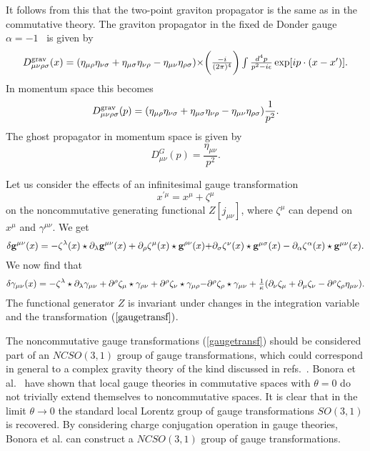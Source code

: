\documentclass[a4paper,10pt]{article}
\begin{document}
It follows from this that the two-point graviton propagator is the same as in the
commutative theory. The graviton propagator in the fixed de
Donder gauge $\alpha=-1$~\cite{Donder} is given by
\begin{equation}
D^{\rm
grav}_{\mu\nu\rho\sigma}(x)
=(\eta_{\mu\rho}\eta_{\nu\sigma}+\eta_{\mu\sigma}\eta_{\nu\rho}
-\eta_{\mu\nu}\eta_{\rho\sigma}) $$ $$
\times\biggl(\frac{-i}{(2\pi)^4}\biggr)\int
\frac{d^4p}{p^2-i\epsilon}\exp[ip\cdot(x-x')].
\end{equation} In momentum
space this becomes
\begin{equation}
D^{\rm grav}_{\mu\nu\rho\sigma}(p)
=(\eta_{\mu\rho}\eta_{\nu\sigma}+\eta_{\mu\sigma}\eta_{\nu\rho}
-\eta_{\mu\nu}\eta_{\rho\sigma})\frac{1}{p^2}.
\end{equation}
The ghost propagator in momentum space is given by
\begin{equation}
D^G_{\mu\nu}(p)=\frac{\eta_{\mu\nu}}{p^2}.
\end{equation}
 
Let us consider the effects of an infinitesimal gauge transformation
\begin{equation}
x^{'\mu}=x^\mu+\zeta^\mu
\end{equation}
on the noncommutative generating functional $Z[j_{\mu\nu}]$, where $\zeta^\mu$ can
depend on $x^\mu$ and $\gamma^{\mu\nu}$. We get
\begin{equation}
\delta{\bf g}^{\mu\nu}(x)
=-\zeta^\lambda(x)\star\partial_\lambda{\bf g}^{\mu\nu}(x)
+\partial_\rho\zeta^\mu(x)\star{\bf g}^{\rho\nu}(x) $$ $$
+\partial_\sigma\zeta^\nu(x)\star{\bf g}^{\mu\sigma}(x)
-\partial_\alpha\zeta^\alpha(x)\star{\bf g}^{\mu\nu}(x). \end{equation} We now find
that
\begin{equation}
\label{gaugetransf}
\delta\gamma_{\mu\nu}(x)=-\zeta^\lambda\star\partial_\lambda\gamma_{\mu\nu}
+\partial^\rho\zeta_\mu\star\gamma_{\rho\nu}+\partial^\rho\zeta_\nu\star\gamma_{\mu\rho}
$$ $$ -\partial^\rho\zeta_\rho\star\gamma_{\mu\nu}
+\frac{1}{\kappa}(\partial_\nu\zeta_\mu+\partial_\mu\zeta_\nu-\partial^\rho\zeta_\rho\eta_{\mu\nu}).
\end{equation}
The functional generator $Z$ is invariant under changes in the
integration variable and the transformation $(\ref{gaugetransf})$.

The noncommutative gauge transformations (\ref{gaugetransf}) should be
considered part of an $NCSO(3,1)$ group of gauge transformations, which
could correspond in general to a complex gravity theory of the kind
discussed in refs.~\cite{Chamseddine,Moffat}. Bonora et al.~\cite{Bonora}
have shown that local gauge theories in commutative spaces with $\theta=0$
do not trivially extend themselves to noncommutative spaces. It is clear
that in the limit $\theta\rightarrow 0$ the standard local Lorentz group of
gauge transformations $SO(3,1)$ is recovered. By considering charge
conjugation operation in gauge theories, Bonora et al. can construct a
$NCSO(3,1)$ group of gauge transformations.
\end{document}
